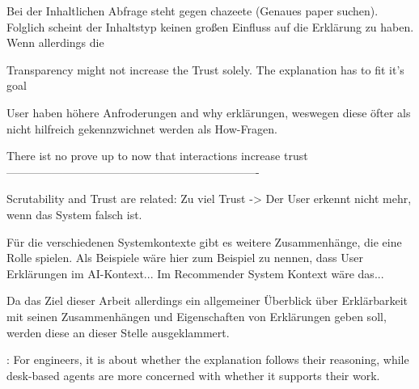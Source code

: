 Bei der Inhaltlichen Abfrage steht \cite{zahedi_towards_2019} gegen chazeete (Genaues paper suchen). Folglich scheint der Inhaltstyp keinen großen Einfluss auf die Erklärung zu haben. Wenn allerdings die 

Transparency might not increase the Trust solely. The explanation has to fit it's goal \cite{wiegand2019drive}

User haben höhere Anfroderungen and why erklärungen, weswegen diese öfter als nicht hilfreich gekennzwichnet werden als How-Fragen. \cite{lim_2009_assessing}

There ist no prove up to now that interactions increase trust \cite{cheng2019explaining}
-------------------------------------------------------------------

Scrutability and Trust are related: Zu viel Trust -> Der User erkennt nicht mehr, wenn das System falsch ist. \cite{gunning2019darpa}

Für die verschiedenen Systemkontexte gibt es weitere Zusammenhänge, die eine Rolle spielen. Als Beispiele wäre hier zum Beispiel zu nennen, dass User Erklärungen im AI-Kontext... Im Recommender System Kontext wäre das...

Da das Ziel dieser Arbeit allerdings ein allgemeiner Überblick über Erklärbarkeit mit seinen Zusammenhängen und Eigenschaften von Erklärungen geben soll, werden diese an dieser Stelle ausgeklammert.

\cite{martin_evaluating_2021}: For engineers, it is about whether the explanation follows their reasoning, while desk-based agents are more concerned with whether it supports their work.